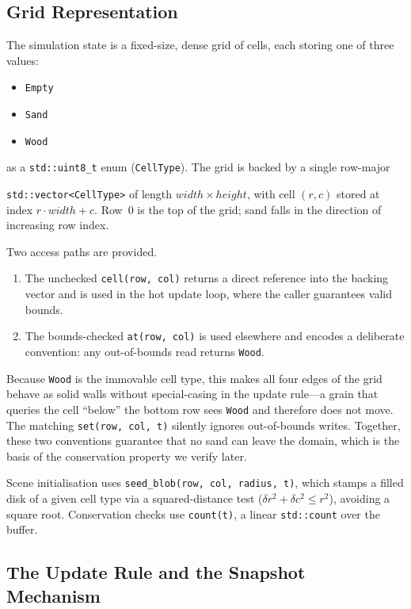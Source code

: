 \documentclass[oneside, a4paper, onecolumn, 11pt]{article}
\begin{document}
\subsection{Grid Representation}

The simulation state is a fixed-size, dense grid of cells, each storing one of three values:
\begin{itemize}
    \item \texttt{Empty}
    \item \texttt{Sand}
    \item \texttt{Wood}
\end{itemize}
as a \texttt{std::uint8\_t} enum (\texttt{CellType}).
The grid is backed by a single row-major

\texttt{std::vector<CellType>} of length $\mathit{width} \times \mathit{height}$, with cell $(r,c)$ stored at index $r \cdot \mathit{width} + c$.
Row~0 is the top of the grid; sand falls in the direction of increasing row index.

Two access paths are provided.
\begin{enumerate}
    \item The unchecked \texttt{cell(row,\,col)} returns a direct reference into the backing vector and is used in the hot update loop, where the caller guarantees valid bounds.
    \item The bounds-checked \texttt{at(row,\,col)} is used elsewhere and encodes a deliberate convention: any out-of-bounds read returns \texttt{Wood}.
\end{enumerate}

Because \texttt{Wood} is the immovable cell type, this makes all four edges of the grid behave as solid walls without special-casing in the update rule---a grain that queries the cell ``below'' the bottom row sees \texttt{Wood} and therefore does not move.
The matching \texttt{set(row,\,col,\,t)} silently ignores out-of-bounds writes.
Together, these two conventions guarantee that no sand can leave the domain, which is the basis of the conservation property we verify later.

Scene initialisation uses \texttt{seed\_blob(row,\,col,\,radius,\,t)}, which stamps a filled disk of a given cell type via a squared-distance test ($\delta r^2 + \delta c^2 \leq r^2$), avoiding a square root.
Conservation checks use \texttt{count(t)}, a linear \texttt{std::count} over the buffer.

\subsection{The Update Rule and the Snapshot Mechanism}
\end{document}
